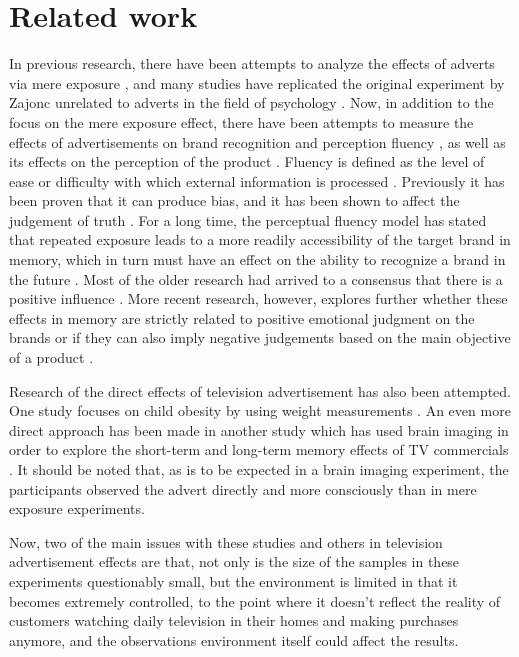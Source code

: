 \documentclass[review]{elsarticle}
\begin{document}
\section{Related work}
\label{related}

In previous research, there have been attempts to analyze the effects of adverts via mere exposure \cite[][]{hekkert}, and many studies have replicated the original experiment by Zajonc unrelated to adverts in the field of psychology \cite[][]{huang,dechene}. Now, in addition to the focus on the mere exposure effect, there have been attempts to measure the effects of advertisements on brand recognition and perception fluency \cite[][]{fang}, as well as its effects on the perception of the product \cite[][]{gmuer}. Fluency is defined as the level of ease or difficulty with which external information is processed \cite[][]{schwarz}. Previously it has been proven that it can produce bias, and it has been shown to affect the judgement of truth \cite[][]{silva}. For a long time, the perceptual fluency model has stated that repeated exposure leads to a more readily accessibility of the target brand in memory, which in turn must have an effect on the ability to recognize a brand in the future \cite[e.g.][]{jacoby}. Most of the older research had arrived to a consensus that there is a positive influence \cite[][]{reber, seamon}. More recent research, however, explores further whether these effects in memory are strictly related to positive emotional judgment on the brands or if they can also imply negative judgements based on the main objective of a product \cite[][]{lee-a}. 

Research of the direct effects of television advertisement has also been attempted. One study focuses on child obesity by using weight measurements \cite[][]{boyland}. An even more direct approach has been made in another study which has used brain imaging in order to explore the short-term and long-term memory effects of TV commercials \cite[][]{rossiter}. It should be noted that, as is to be expected in a brain imaging experiment, the participants observed the advert directly and more consciously than in mere exposure experiments. 

Now, two of the main issues with these studies and others in television advertisement effects are that, not only is the size of the samples in these experiments questionably small, but the environment is limited in that it becomes extremely controlled, to the point where it doesn't reflect the reality of customers watching daily television in their homes and making purchases anymore, and the observations environment itself could affect the results. 
\end{document}
